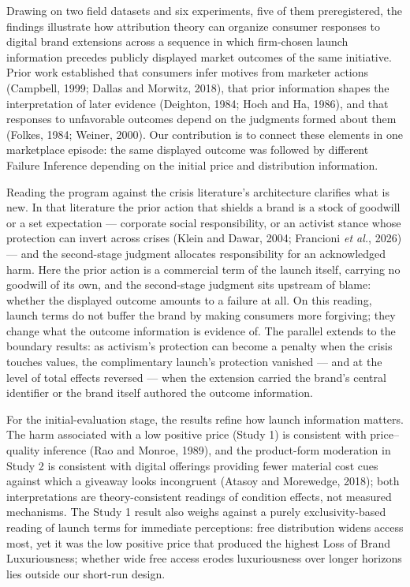 \documentclass[12pt, a4paper]{article}
\begin{document}
Drawing on two field datasets and six experiments, five of them preregistered, the findings illustrate how attribution theory can organize consumer responses to digital brand extensions across a sequence in which firm-chosen launch information precedes publicly displayed market outcomes of the same initiative. Prior work established that consumers infer motives from marketer actions (Campbell, 1999; Dallas and Morwitz, 2018), that prior information shapes the interpretation of later evidence (Deighton, 1984; Hoch and Ha, 1986), and that responses to unfavorable outcomes depend on the judgments formed about them (Folkes, 1984; Weiner, 2000). Our contribution is to connect these elements in one marketplace episode: the same displayed outcome was followed by different Failure Inference depending on the initial price and distribution information.

Reading the program against the crisis literature's architecture clarifies what is new. In that literature the prior action that shields a brand is a stock of goodwill or a set expectation --- corporate social responsibility, or an activist stance whose protection can invert across crises (Klein and Dawar, 2004; Francioni \emph{et al.}, 2026) --- and the second-stage judgment allocates responsibility for an acknowledged harm. Here the prior action is a commercial term of the launch itself, carrying no goodwill of its own, and the second-stage judgment sits upstream of blame: whether the displayed outcome amounts to a failure at all. On this reading, launch terms do not buffer the brand by making consumers more forgiving; they change what the outcome information is evidence of. The parallel extends to the boundary results: as activism's protection can become a penalty when the crisis touches values, the complimentary launch's protection vanished --- and at the level of total effects reversed --- when the extension carried the brand's central identifier or the brand itself authored the outcome information.

For the initial-evaluation stage, the results refine how launch information matters. The harm associated with a low positive price (Study 1) is consistent with price--quality inference (Rao and Monroe, 1989), and the product-form moderation in Study 2 is consistent with digital offerings providing fewer material cost cues against which a giveaway looks incongruent (Atasoy and Morewedge, 2018); both interpretations are theory-consistent readings of condition effects, not measured mechanisms. The Study 1 result also weighs against a purely exclusivity-based reading of launch terms for immediate perceptions: free distribution widens access most, yet it was the low positive price that produced the highest Loss of Brand Luxuriousness; whether wide free access erodes luxuriousness over longer horizons lies outside our short-run design.
\end{document}
